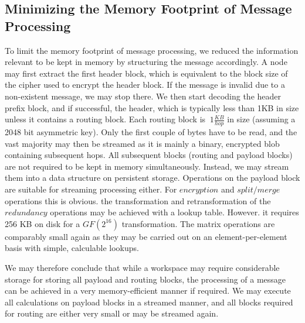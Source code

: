 \subsection{Minimizing the Memory Footprint of Message Processing}
To limit the memory footprint of message processing, we reduced the information relevant to be kept in memory by structuring the message accordingly. A node may first extract the first header block, which is equivalent to the block size of the cipher used to encrypt the header block. If the message is invalid due to a non-existent message, we may stop there. We then start decoding the header prefix block, and if successful, the header, which is typically less than 1KB in size unless it contains a routing block. Each routing block is $~1 \frac{KB}{hop}$ in size (assuming a 2048 bit asymmetric key). Only the first couple of bytes have to be read, and the vast majority may then be streamed as it is mainly a binary, encrypted blob containing subsequent hops. All subsequent blocks (routing and payload blocks) are not required to be kept in memory simultaneously. Instead, we may stream them into a data structure on persistent storage. Operations on the payload block are suitable for streaming processing either. For $encryption$ and $split/merge$ operations this is obvious. the transformation and retransformation of the $redundancy$ operations may be achieved with a lookup table. However. it requires 256 KB on disk for a $GF(2^{16})$ transformation. The matrix operations are comparably small again as they may be carried out on an element-per-element basis with simple, calculable lookups. 

We may therefore conclude that while a workspace may require considerable storage for storing all payload and routing blocks, the processing of a message can be achieved in a very memory-efficient manner if required. We may execute all calculations on payload blocks in a streamed manner, and all blocks required for routing are either very small or may be streamed again.
